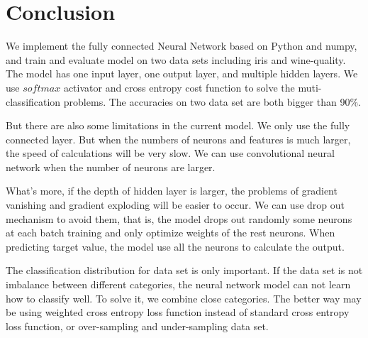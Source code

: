 \section{Conclusion}
We implement the fully connected Neural Network based on Python and numpy, and train and evaluate model on two data sets including iris and wine-quality. The model has one input layer, one output layer, and multiple hidden layers. We use \(softmax\) activator and cross entropy cost function to solve the muti-classification problems. The accuracies on two data set are both bigger than 90\%.

But there are also some limitations in the current model. We only use the fully connected layer. But when the numbers of neurons and features is much larger, the speed of calculations will be very slow. We can use convolutional neural network when the number of neurons are larger.

What's more, if the depth of hidden layer is larger, the problems of gradient vanishing and gradient exploding will be easier to occur. We can use drop out mechanism to avoid them, that is, the model drops out randomly some neurons at each batch training and only optimize weights of the rest neurons. When predicting target value, the model use all the neurons to calculate the output.

The classification distribution for data set is only important. If the data set is not imbalance between different categories, the neural network model can not learn how to classify well. To solve it, we combine close categories. The better way may be using weighted cross entropy loss function instead of standard cross entropy loss function, or over-sampling and under-sampling data set.
